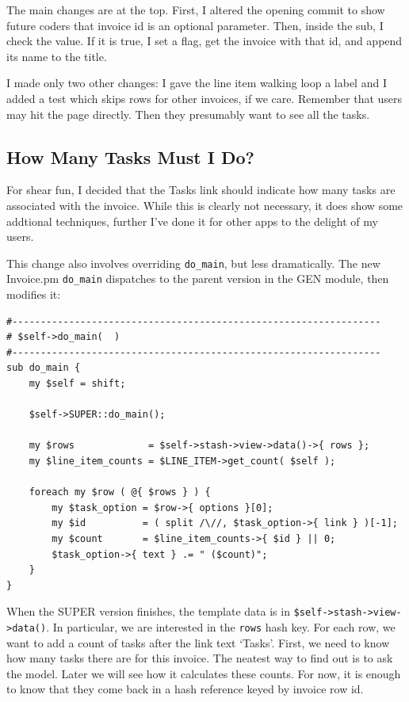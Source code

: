 The main changes are at the top.  First, I altered the opening commit to
show future coders that invoice id is an optional parameter.   Then, inside
the sub, I check the value.  If it is true, I set a flag, get the invoice
with that id, and append its name to the title.

I made only two other changes: I gave the line item walking loop a label
and I added a test which skips rows for other invoices, if we care.  Remember
that users may hit the page directly.  Then they presumably want to see
all the tasks.

\subsection*{How Many Tasks Must I Do?}

For shear fun, I decided that the Tasks link should indicate how many
tasks are associated with the invoice.  While this is clearly not necessary,
it does show some addtional techniques, further I've done it for other apps
to the delight of my users.

This change also involves overriding \verb+do_main+, but less dramatically.
The new Invoice.pm \verb+do_main+ dispatches to the parent version in the
GEN module, then modifies it:

\begin{verbatim}
#-----------------------------------------------------------------
# $self->do_main(  )
#-----------------------------------------------------------------
sub do_main {
    my $self = shift;

    $self->SUPER::do_main();

    my $rows             = $self->stash->view->data()->{ rows };
    my $line_item_counts = $LINE_ITEM->get_count( $self );

    foreach my $row ( @{ $rows } ) {
        my $task_option = $row->{ options }[0];
        my $id          = ( split /\//, $task_option->{ link } )[-1];
        my $count       = $line_item_counts->{ $id } || 0;
        $task_option->{ text } .= " ($count)";
    }
}
\end{verbatim}

When the SUPER version finishes, the template data is in
\verb+$self->stash->view->data()+.  In particular, we are interested in the
\verb+rows+ hash key.  For each row, we want to add a count of tasks after
the link text `Tasks'.  First, we need to know how many tasks there are for
this invoice.  The neatest way to find out is to ask the model.  Later we
will see how it calculates these counts.  For now, it is enough to know
that they come back in a hash reference keyed by invoice row id.

